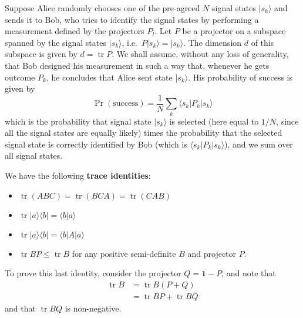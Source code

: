 \documentclass[fleqn]{article}
\providecommand{\tightlist}{%
  \setlength{\itemsep}{0pt}\setlength{\parskip}{0pt}}
\newenvironment{idea}{\noindent}{\medskip}
\begin{document}
Suppose Alice randomly chooses one of the pre-agreed \(N\) signal states \(|s_k\rangle\) and sends it to Bob, who tries to identify the signal states by performing a measurement defined by the projectors \(P_l\).
Let \(P\) be a projector on a subspace spanned by the signal states \(|s_k\rangle\), i.e.~\(P|s_k\rangle = |s_k\rangle\).
The dimension \(d\) of this subspace is given by \(d = \operatorname{tr}P\).
We shall assume, without any loss of generality, that Bob designed his measurement in such a way that, whenever he gets outcome \(P_k\), he concludes that Alice sent state \(|s_k\rangle\).
His probability of success is given by
\[
  \Pr(\text{success})
  = \frac{1}{N} \sum_k \langle s_k|P_k|s_k\rangle
\]
which is the probability that signal state \(|s_k\rangle\) is selected (here equal to \(1/N\), since all the signal states are equally likely) times the probability that the selected signal state is correctly identified by Bob (which is \(\langle s_k|P_k|s_k\rangle\)), and we sum over all signal states.

\begin{idea}

We have the following \textbf{trace identities}:

\begin{itemize}
\tightlist
\item
  \(\operatorname{tr}(ABC) = \operatorname{tr}(BCA) = \operatorname{tr}(CAB)\)
\item
  \(\operatorname{tr}|a\rangle\langle b| = \langle b|a\rangle\)
\item
  \(\operatorname{tr}|a\rangle\langle b| = \langle b|A|a\rangle\)
\item
  \(\operatorname{tr}BP \leqslant\operatorname{tr}B\) for any positive semi-definite \(B\) and projector \(P\).
\end{itemize}

To prove this last identity, consider the projector \(Q=\mathbf{1}-P\), and note that
\[
  \begin{aligned}
    \operatorname{tr}B
    &= \operatorname{tr}B(P+Q)
  \\&= \operatorname{tr}BP + \operatorname{tr}BQ
  \end{aligned}
\]
and that \(\operatorname{tr}BQ\) is non-negative.

\end{idea}
\end{document}
